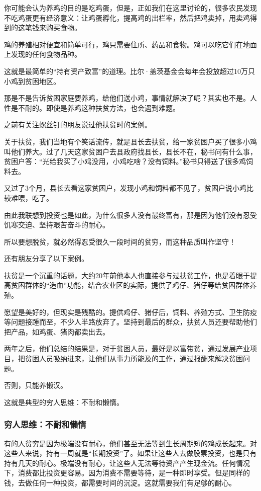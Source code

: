 {\kaishu 你可能会认为养鸡的目的是吃鸡蛋，但是，正如我们在这里讨论的，很多农民发现不吃鸡蛋更有经济意义：让鸡蛋孵化，提高鸡的出栏率，然后把鸡卖掉，用卖鸡得到的这笔钱来购买食物。}

{\kaishu 鸡的养殖相对便宜和简单可行，鸡只需要住所、药品和食物。鸡可以吃它们在地面上发现的任何食物品种。}

这就是最简单的“持有资产致富”的道理。比尔·盖茨基金会每年会投放超过10万只小鸡到贫困地区。

那是不是告诉贫困家庭要养鸡，给他们送小鸡，事情就解决了呢？其实也不是。人性是不耐的。即使是养鸡这种扶贫方法，也会遇到难题。

之前有关注螺丝钉的朋友说过他扶贫时的案例。

{\kaishu 关于扶贫，我们当地有个笑话流传，就是县长去扶贫，给一家贫困户买了很多小鸡叫他们养大。过了几天这家贫困户去县政府找县长，县长不在，秘书问有什么事，贫困户答：“光给我买了小鸡没用，小鸡吃啥？没有饲料。”秘书只得送了很多鸡饲料去。}

{\kaishu 又过了3个月，县长去看这家贫困户，发现小鸡和饲料都不见了，贫困户说小鸡比较难喂，吃了。}

{\kaishu 由此我联想到投资也是如此，为什么很多人没有最终富有，那是因为他们没有忍受饥寒交迫、坚持艰苦奋斗的耐心。}

{\kaishu 所以要想脱贫，就必然得忍受很久一段时间的贫穷，而这种品质叫作坚守！}

还有朋友分享了以下案例。

{\kaishu 扶贫是一个沉重的话题，大约20年前他本人也直接参与过扶贫工作，也是着眼于提高贫困群体的“造血”功能，结合农业区的实际，提供了鸡仔、猪仔等给贫困群体养殖。}

{\kaishu 愿望是美好的，但现实是残酷的。提供鸡仔、猪仔后，饲料、养殖方式、卫生防疫等问题接踵而至，不少人半路放弃了。坚持到最后的群众，扶贫人员还要帮助他们把产品，如鸡蛋、猪肉都卖出去。}

{\kaishu 两年之后，他们总结的结果是，对于贫困人员，最好是以富带贫，通过发展产业项目，把贫困人员吸纳进来，让他们从事力所能及的工作，通过报酬来解决贫困问题。}

{\kaishu 否则，只能养懒汉。}

这就是典型的穷人思维：不耐和懒惰。

\subsubsection{穷人思维：不耐和懒惰}

有的人贫穷是因为极端没有耐心，他们甚至无法等到生长周期短的鸡成长起来。对这些人来说，持有一周就是“长期投资”了。如果让这些人去做股票投资，也是只有持有几天的耐心。极端没有耐心，让这些人无法等待资产产生现金流。任何情况下，消费都比投资更容易。因为消费不需要等待，是一种即时享受。但是同样的钱，去做任何一种投资，都需要时间的沉淀。这就需要我们有足够的耐心。

